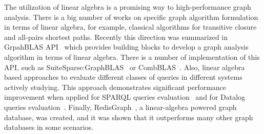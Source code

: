The utilization of linear algebra is a promising way to high-performance graph analysis.
There is a big number of works on specific graph algorithm formulation in terms of linear algebra, for example, classical algorithms for transitive closure and all-pairs shortest paths.
Recently this direction was summarized in GrpahBLAS API~\cite{7761646} which provides building blocks to develop a graph analysis algorithm in terms of linear algebra. 
There is a number of implementation of this API, such as SuiteSparse:GraphBLAS~\cite{10.1145/3322125} or CombBLAS~\cite{10.1177/1094342011403516}.
Also, linear algebra based approaches to evaluate different classes of queries in different systems actively studying. This approach demonstrates significant performance improvement when applied for SPARQL queries evaluation~\cite{10.1145/3302424.3303962,DBLP:journals/corr/MetzlerM15a} and for Datalog queries evaluation~\cite{sato_2017}.
Finally, RedisGraph~\cite{8778293}, a linear-algebra powered graph database, was created, and it was shown that it outperforms many other graph databases in some scenarios. 